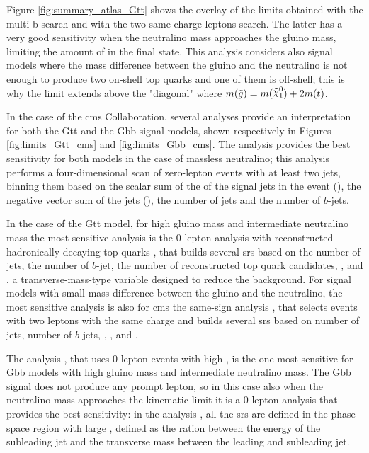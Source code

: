 Figure \ref{fig:summary_atlas_Gtt} shows the overlay of the limits obtained with the multi-b search and with the two-same-charge-leptons search.
The latter has a very good sensitivity when the neutralino mass approaches the gluino mass,
limiting the amount of \met in the final state.
This analysis considers also signal models where the mass difference between the gluino and the neutralino 
is not enough to produce two on-shell top quarks and one of them is off-shell; this is why the limit extends above 
the "diagonal" where $m(\tilde{g}) = m(\ninoone) + 2 m(t)$.


In the case of the \gls{cms} Collaboration, several analyses provide an interpretation for both the Gtt and 
the Gbb signal models, shown respectively in Figures \ref{fig:limits_Gtt_cms} and \ref{fig:limits_Gbb_cms}.
The \htmiss analysis \cite{Sirunyan:2017cwe} provides the best sensitivity for both models in the case of massless 
neutralino; this analysis performs a four-dimensional scan of zero-lepton events with at least two jets, binning them 
based on the scalar sum of the \pt of the signal jets in the event (\Ht), the negative vector sum of the jets (\htmiss), 
the number of jets and the number of $b$-jets. 

In the case of the Gtt model, for high gluino mass and intermediate neutralino mass the most sensitive analysis is
the 0-lepton analysis with reconstructed hadronically decaying top quarks \cite{Sirunyan:2017pjw}, 
that builds several \glspl{sr} based on the number of jets, the number of $b$-jet, the number of reconstructed top quark 
candidates, \met, \Ht and \mttwo, a transverse-mass-type variable designed to reduce the \ttbar background. 
For signal models with small mass difference between the gluino and the neutralino, the most sensitive analysis 
is also for \gls{cms} the same-sign analysis \cite{Sirunyan:2017uyt}, that selects events with two leptons with 
the same charge and builds several \glspl{sr} based on number of jets, number of $b$-jets, \met, \Ht, and \mt. 

The \mttwo analysis \cite{Sirunyan:2017kqq}, that uses 0-lepton events with high \mttwo,
 is the one most sensitive for Gbb models with high gluino mass 
and intermediate neutralino mass. 
The Gbb signal does not produce any prompt lepton, so in this case also when the neutralino mass approaches the kinematic 
limit it is a 0-lepton analysis that provides the best sensitivity: 
in the \alphat analysis \cite{Sirunyan:2018vjp}, all the \glspl{sr} are defined in the phase-space region 
with large \alphat, defined as the ration between the energy of the subleading jet and the transverse mass
between the leading and subleading jet. 

